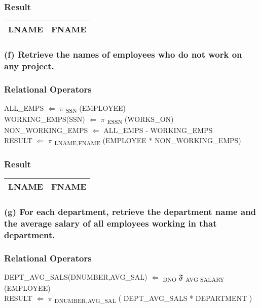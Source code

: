 \documentclass[11pt, oneside]{article}   	%
\begin{document}
\subsubsection*{Result}
\begin{center}
\begin{tabular}{ c | c }
  LNAME & FNAME \\ \hline
\end{tabular}
\end{center}

\subsubsection*{(f) Retrieve the names of employees who do not work on any project.}
\subsubsection*{Relational Operators}
ALL\_EMPS $\Leftarrow$ $\pi$ \textsubscript{SSN} (EMPLOYEE) \\
WORKING\_EMPS(SSN) $\Leftarrow$ $\pi$ \textsubscript{ESSN} (WORKS\_ON)\\
NON\_WORKING\_EMPS $\Leftarrow$ ALL\_EMPS - WORKING\_EMPS\\
RESULT $\Leftarrow$ $\pi$ \textsubscript{LNAME,FNAME} (EMPLOYEE * NON\_WORKING\_EMPS)

\subsubsection*{Result}
\begin{center}
\begin{tabular}{ c | c }
  LNAME & FNAME \\ \hline
\end{tabular}
\end{center}
\subsubsection*{(g) For each department, retrieve the department name and the average salary of all employees working in that department.}
\subsubsection*{Relational Operators}
DEPT\_AVG\_SALS(DNUMBER,AVG\_SAL) $\Leftarrow$ \textsubscript{DNO} $\mathfrak{F}$ \textsubscript{AVG SALARY} (EMPLOYEE)\\
RESULT $\Leftarrow$ $\pi$ \textsubscript{DNUMBER,AVG\_SAL} ( DEPT\_AVG\_SALS * DEPARTMENT )
\end{document}
